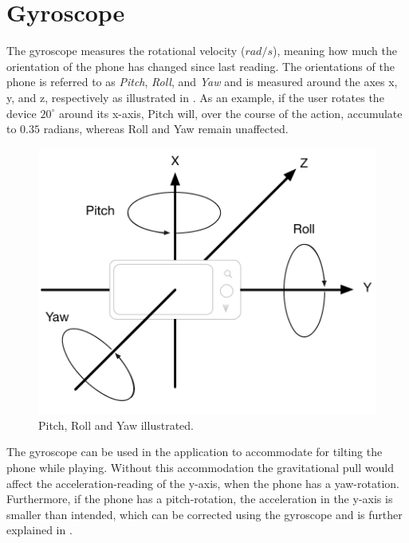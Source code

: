 \section{Gyroscope}\label{section:gyroscope}

The gyroscope measures the rotational velocity ($rad/s$), meaning how much the orientation of the phone has changed since last reading.
The orientations of the phone is referred to as \textit{Pitch}, \textit{Roll}, and \textit{Yaw} and is measured around the axes x, y, and z, respectively as illustrated in . 
As an example, if the user rotates the device $20^\circ$ around its x-axis, Pitch will, over the course of the action, accumulate to $0.35$ radians, whereas Roll and Yaw remain unaffected.

\begin{figure}[h]
	\centering
	\includegraphics[scale=0.5]{media/phone-rotation/phone-gyroscope}
	\caption{Pitch, Roll and Yaw illustrated.}
	\label{figure:phone-gyroscope}
\end{figure}

The gyroscope can be used in the application to accommodate for tilting the phone while playing.
Without this accommodation the gravitational pull would affect the acceleration-reading of the y-axis, when the phone has a yaw-rotation.
Furthermore, if the phone has a pitch-rotation, the acceleration in the y-axis is smaller than intended, which can be corrected using the gyroscope and is further explained in .

